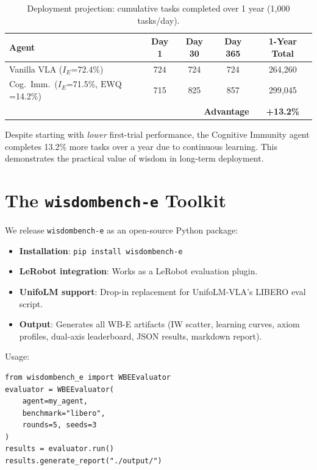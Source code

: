 ﻿\documentclass{article}
\newcommand{\EWQ}{\mathrm{EWQ}}
\begin{document}
\begin{table}[h]
\centering
\caption{Deployment projection: cumulative tasks completed over 1 year (1{,}000 tasks/day).}
\label{tab:deployment}
\begin{tabular}{lcccc}
\toprule
\textbf{Agent} & Day 1 & Day 30 & Day 365 & \textbf{1-Year Total} \\
\midrule
Vanilla VLA ($I_E$=72.4\%) & 724 & 724 & 724 & 264{,}260 \\
Cog.\ Imm.\ ($I_E$=71.5\%, $\EWQ$=14.2\%) & 715 & 825 & 857 & 299{,}045 \\
\midrule
\multicolumn{4}{r}{\textbf{Advantage}} & \textbf{+13.2\%} \\
\bottomrule
\end{tabular}
\end{table}

Despite starting with \emph{lower} first-trial performance, the Cognitive Immunity agent completes 13.2\% more tasks over a year due to continuous learning.
This demonstrates the practical value of wisdom in long-term deployment.

\section{The \texttt{wisdombench-e} Toolkit}
\label{sec:toolkit}

We release \texttt{wisdombench-e} as an open-source Python package:

\begin{itemize}[leftmargin=*,itemsep=2pt]
    \item \textbf{Installation}: \texttt{pip install wisdombench-e}
    \item \textbf{LeRobot integration}: Works as a LeRobot evaluation plugin.
    \item \textbf{UnifoLM support}: Drop-in replacement for UnifoLM-VLA's LIBERO eval script.
    \item \textbf{Output}: Generates all WB-E artifacts (IW scatter, learning curves, axiom profiles, dual-axis leaderboard, JSON results, markdown report).
\end{itemize}

Usage:
\begin{verbatim}
from wisdombench_e import WBEEvaluator
evaluator = WBEEvaluator(
    agent=my_agent,
    benchmark="libero",
    rounds=5, seeds=3
)
results = evaluator.run()
results.generate_report("./output/")
\end{verbatim}
\end{document}
